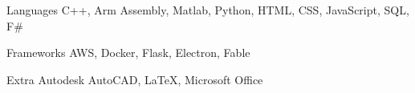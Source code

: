 
\begin{cvskills}
  \cvskill
    {Languages} %
    {C++, Arm Assembly, Matlab, Python, HTML, CSS, JavaScript, SQL, F\#} %

  \cvskill
    {Frameworks} %
    {AWS, Docker, Flask, Electron, Fable} %
    
  \cvskill
    {Extra} %
    {Autodesk AutoCAD, LaTeX, Microsoft Office} %
\end{cvskills}
